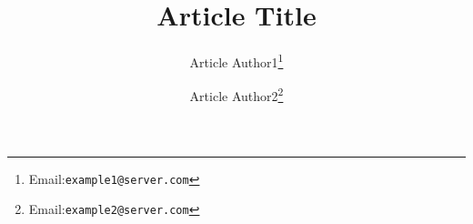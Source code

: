 \title{Article Title}
\author{Article Author1\thanks{Email:\texttt{example1@server.com} }}
\author{Article Author2\thanks{Email:\texttt{example2@server.com} }}
\linespread{1.0}
\maketitle
\linespread{1.5}
